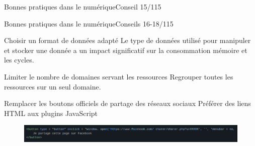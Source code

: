 \begin{frame}{Bonnes pratiques dans le numérique}{Conseil 15/115}
\begin{minipage}[b]{0.6\linewidth}
\begin{figure}
\end{figure}
\end{minipage}\hfill


\end{frame}

\begin{frame}{Bonnes pratiques dans le numérique}{Conseils 16-18/115}

\begin{block}{Choisir un format de données adapté}
Le type de données utilisé pour manipuler et stocker une donnée a un impact significatif sur la consommation mémoire et les cycles.
\end{block}

\begin{block}{Limiter le nombre de domaines servant les ressources}
 Regrouper toutes les ressources sur un seul domaine.
 \end{block}

\begin{block}{Remplacer les boutons officiels de partage des réseaux sociaux}
Préférer des liens HTML aux plugins JavaScript
\begin{figure}
    \centering
    \includegraphics[scale=0.305]{chapitre2/wdd2/fig/code.png}
\end{figure}


 \end{block}
 
 
 
\end{frame}




